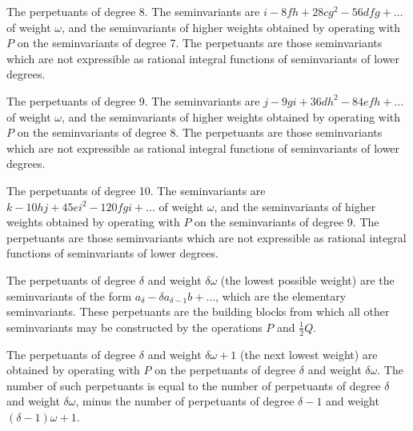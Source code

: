 \documentclass[11pt,a4paper]{book}
\begin{document}
{{{\setcounter{art}{67}
\begin{art}
The perpetuants of degree 8. The seminvariants are $i - 8fh + 28cg^{2} - 56dfg + \ldots$ of weight $\omega$, and the seminvariants of higher weights obtained by operating with $P$ on the seminvariants of degree 7. The perpetuants are those seminvariants which are not expressible as rational integral functions of seminvariants of lower degrees.
\end{art}

\setcounter{art}{68}
\begin{art}
The perpetuants of degree 9. The seminvariants are $j - 9gi + 36dh^{2} - 84efh + \ldots$ of weight $\omega$, and the seminvariants of higher weights obtained by operating with $P$ on the seminvariants of degree 8. The perpetuants are those seminvariants which are not expressible as rational integral functions of seminvariants of lower degrees.
\end{art}

\setcounter{art}{69}
\begin{art}
The perpetuants of degree 10. The seminvariants are $k - 10hj + 45ei^{2} - 120fgi + \ldots$ of weight $\omega$, and the seminvariants of higher weights obtained by operating with $P$ on the seminvariants of degree 9. The perpetuants are those seminvariants which are not expressible as rational integral functions of seminvariants of lower degrees.
\end{art}

\setcounter{art}{70}
\begin{art}
The perpetuants of degree $\delta$ and weight $\delta\omega$ (the lowest possible weight) are the seminvariants of the form $a_{\delta} - \delta a_{\delta - 1}b + \ldots$, which are the elementary seminvariants. These perpetuants are the building blocks from which all other seminvariants may be constructed by the operations $P$ and $\frac{1}{2}Q$.
\end{art}

\setcounter{art}{71}
\begin{art}
The perpetuants of degree $\delta$ and weight $\delta\omega + 1$ (the next lowest weight) are obtained by operating with $P$ on the perpetuants of degree $\delta$ and weight $\delta\omega$. The number of such perpetuants is equal to the number of perpetuants of degree $\delta$ and weight $\delta\omega$, minus the number of perpetuants of degree $\delta - 1$ and weight $(\delta - 1)\omega + 1$.
\end{art}

}}}
\end{document}
